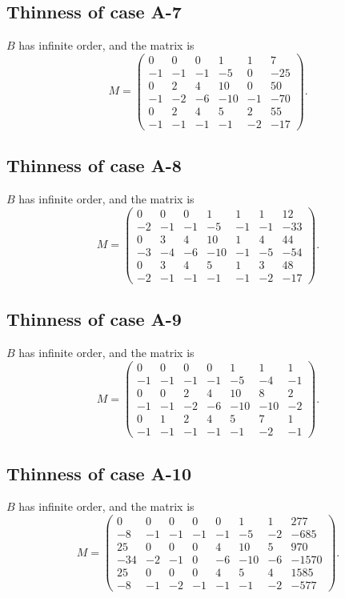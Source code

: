 \documentclass[11pt,a4paper]{amsart}
\theoremstyle{definition}
\theoremstyle{definition}
\numberwithin{equation}{section}
\begin{document}
\subsection{Thinness of case A-7}
$B$ has infinite order, and the matrix is
$$ M=\left(\begin{array}{rrrrrr}
0 & 0 & 0 & 1 & 1 & 7 \\
-1 & -1 & -1 & -5 & 0 & -25 \\
0 & 2 & 4 & 10 & 0 & 50 \\
-1 & -2 & -6 & -10 & -1 & -70 \\
0 & 2 & 4 & 5 & 2 & 55 \\
-1 & -1 & -1 & -1 & -2 & -17
\end{array}\right).
$$

\subsection{Thinness of case A-8}
$B$ has infinite order, and the matrix is
$$ M=\left(\begin{array}{rrrrrrr}
0 & 0 & 0 & 1 & 1 & 1 & 12 \\
-2 & -1 & -1 & -5 & -1 & -1 & -33 \\
0 & 3 & 4 & 10 & 1 & 4 & 44 \\
-3 & -4 & -6 & -10 & -1 & -5 & -54 \\
0 & 3 & 4 & 5 & 1 & 3 & 48 \\
-2 & -1 & -1 & -1 & -1 & -2 & -17
\end{array}\right).$$

\subsection{Thinness of case A-9}
$B$ has infinite order, and the matrix is
$$ M=\left(\begin{array}{rrrrrrr}
0 & 0 & 0 & 0 & 1 & 1 & 1 \\
-1 & -1 & -1 & -1 & -5 & -4 & -1 \\
0 & 0 & 2 & 4 & 10 & 8 & 2 \\
-1 & -1 & -2 & -6 & -10 & -10 & -2 \\
0 & 1 & 2 & 4 & 5 & 7 & 1 \\
-1 & -1 & -1 & -1 & -1 & -2 & -1
\end{array}\right).
$$

\subsection{Thinness of case A-10}
$B$ has infinite order, and the matrix is
$$ M=\left(\begin{array}{rrrrrrrr}
0 & 0 & 0 & 0 & 0 & 1 & 1 & 277 \\
-8 & -1 & -1 & -1 & -1 & -5 & -2 & -685 \\
25 & 0 & 0 & 0 & 4 & 10 & 5 & 970 \\
-34 & -2 & -1 & 0 & -6 & -10 & -6 & -1570 \\
25 & 0 & 0 & 0 & 4 & 5 & 4 & 1585 \\
-8 & -1 & -2 & -1 & -1 & -1 & -2 & -577
\end{array}\right).
$$
\end{document}
